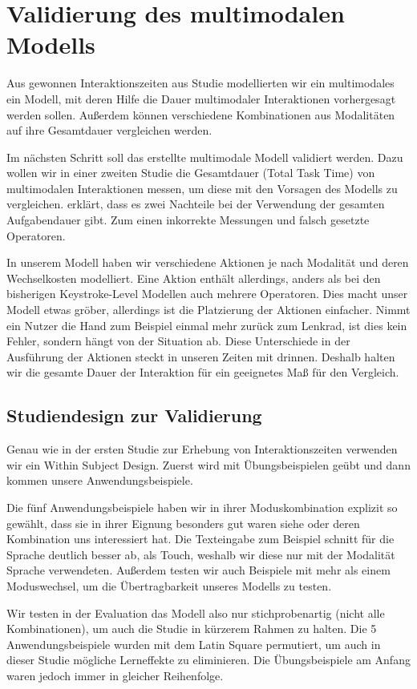 \chapter[Validierung]{Validierung des multimodalen Modells}\label{cha:Evaluation}
Aus gewonnen Interaktionszeiten aus Studie modellierten wir ein multimodales ein Modell, mit deren Hilfe die Dauer multimodaler Interaktionen vorhergesagt werden sollen.
Außerdem können verschiedene Kombinationen aus Modalitäten auf ihre Gesamtdauer vergleichen werden. 

Im nächsten Schritt soll das erstellte multimodale Modell validiert werden. 
Dazu wollen wir in einer zweiten Studie die Gesamtdauer (Total Task Time) von multimodalen Interaktionen messen, um diese mit den Vorsagen des Modells zu vergleichen.
\citet{Teo:2006} erklärt, dass es zwei Nachteile bei der Verwendung der gesamten Aufgabendauer gibt. 
Zum einen inkorrekte Messungen und falsch gesetzte Operatoren. 

In unserem Modell haben wir verschiedene Aktionen je nach Modalität und deren Wechselkosten modelliert. 
Eine Aktion enthält allerdings, anders als bei den bisherigen Keystroke-Level Modellen auch mehrere Operatoren. 
Dies macht unser Modell etwas gröber, allerdings ist die Platzierung der Aktionen einfacher. 
Nimmt ein Nutzer die Hand zum Beispiel einmal mehr zurück zum Lenkrad, ist dies kein Fehler, sondern hängt von der Situation ab. 
Diese Unterschiede in der Ausführung der Aktionen steckt in unseren Zeiten mit drinnen. 
Deshalb halten wir die gesamte Dauer der Interaktion für ein geeignetes Maß für den Vergleich. 
\section[Studiendesign]{Studiendesign zur Validierung}
Genau wie in der ersten Studie zur Erhebung von Interaktionszeiten verwenden wir ein Within Subject Design. 
Zuerst wird mit Übungsbeispielen geübt und dann kommen unsere Anwendungsbeispiele. 

Die fünf Anwendungsbeispiele haben wir in ihrer Moduskombination explizit so gewählt, dass sie in ihrer Eignung besonders gut waren siehe  oder deren Kombination uns interessiert hat. Die Texteingabe zum Beispiel schnitt für die Sprache deutlich besser ab, als Touch, weshalb wir diese nur mit der Modalität Sprache verwendeten. Außerdem testen wir auch Beispiele mit mehr als einem Moduswechsel, um die Übertragbarkeit unseres Modells zu testen. 

Wir testen in der Evaluation das Modell also nur stichprobenartig (nicht alle Kombinationen), um auch die Studie in kürzerem Rahmen zu halten. Die 5 Anwendungsbeispiele wurden mit dem Latin Square permutiert, um auch in dieser Studie mögliche Lerneffekte zu eliminieren. Die Übungsbeispiele am Anfang waren jedoch immer in gleicher Reihenfolge. 
